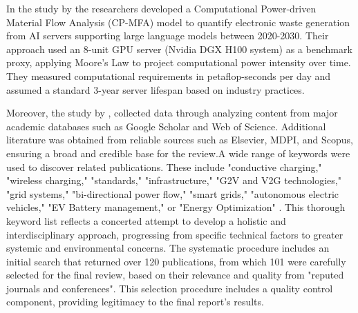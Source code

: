 \documentclass[a4paper, 12pt]{article}
\begin{document}
\par In the study by \cite{wang_2024_ewaste} the researchers developed a Computational Power-driven Material Flow Analysis (CP-MFA) model to quantify electronic waste generation from AI servers supporting large language models between 2020-2030. Their approach used an 8-unit GPU server (Nvidia DGX H100 system) as a benchmark proxy, applying Moore's Law to project computational power intensity over time. They measured computational requirements in petaflop-seconds per day and assumed a standard 3-year server lifespan based on industry practices. \hfill \break
\par Moreover, the study by \citet{M.rauf2024}, collected data through analyzing content from major academic databases such as Google Scholar and Web of Science. Additional literature was obtained from reliable sources such as Elsevier, MDPI, and Scopus, ensuring a broad and credible base for the review.A wide range of keywords were used to discover related publications.  These include "conductive charging," "wireless charging," "standards," "infrastructure," "G2V and V2G technologies," "grid systems," "bi-directional power flow," "smart grids," "autonomous electric vehicles," "EV Battery management," or "Energy Optimization" .  This thorough keyword list reflects a concerted attempt to develop a holistic and interdisciplinary approach, progressing from specific technical factors to greater systemic and environmental concerns.  The systematic procedure includes an initial search that returned over 120 publications, from which 101 were carefully selected for the final review, based on their relevance and quality from "reputed journals and conferences".  This selection procedure includes a quality control component, providing legitimacy to the final report's results.
\end{document}
